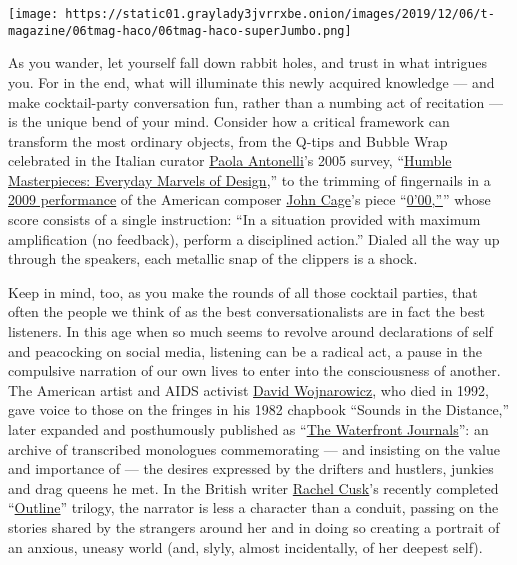 \texttt{[image: https://static01.graylady3jvrrxbe.onion/images/2019/12/06/t-magazine/06tmag-haco/06tmag-haco-superJumbo.png]}

As you wander, let yourself fall down rabbit holes, and trust in what
intrigues you. For in the end, what will illuminate this newly acquired
knowledge --- and make cocktail-party conversation fun, rather than a
numbing act of recitation --- is the unique bend of your mind. Consider
how a critical framework can transform the most ordinary objects, from
the Q-tips and Bubble Wrap celebrated in the Italian curator
\href{https://www.nytimes3xbfgragh.onion/2014/07/13/business/surrounded-by-great-design-at-moma-and-not-afraid-to-use-it.html}{Paola
Antonelli}'s 2005 survey,
``\href{https://www.moma.org/calendar/exhibitions/124}{Humble
Masterpieces: Everyday Marvels of Design},'' to the trimming of
fingernails in a \href{https://www.youtube.com/watch?v=6I1gfOlNNo4}{2009
performance} of the American composer
\href{https://www.nytimes3xbfgragh.onion/topic/person/john-cage}{John
Cage}'s piece
``\href{https://www.johncage.org/pp/John-Cage-Work-Detail.cfm?work_ID=18}{0'00,''}''
whose score consists of a single instruction: ``In a situation provided
with maximum amplification (no feedback), perform a disciplined
action.'' Dialed all the way up through the speakers, each metallic snap
of the clippers is a shock.

Keep in mind, too, as you make the rounds of all those cocktail parties,
that often the people we think of as the best conversationalists are in
fact the best listeners. In this age when so much seems to revolve
around declarations of self and peacocking on social media, listening
can be a radical act, a pause in the compulsive narration of our own
lives to enter into the consciousness of another. The American artist
and AIDS activist
\href{https://www.nytimes3xbfgragh.onion/2018/09/07/magazine/the-rage-and-tenderness-of-david-wojnarowiczs-art.html}{David
Wojnarowicz}, who died in 1992, gave voice to those on the fringes in
his 1982 chapbook ``Sounds in the Distance,'' later expanded and
posthumously published as
``\href{https://groveatlantic.com/book/the-waterfront-journals/}{The
Waterfront Journals}'': an archive of transcribed monologues
commemorating --- and insisting on the value and importance of --- the
desires expressed by the drifters and hustlers, junkies and drag queens
he met. In the British writer
\href{https://www.nytimes3xbfgragh.onion/by/rachel-cusk}{Rachel Cusk}'s
recently completed
``\href{https://us.macmillan.com/series/outlinetrilogy/}{Outline}''
trilogy, the narrator is less a character than a conduit, passing on the
stories shared by the strangers around her and in doing so creating a
portrait of an anxious, uneasy world (and, slyly, almost incidentally,
of her deepest self).

